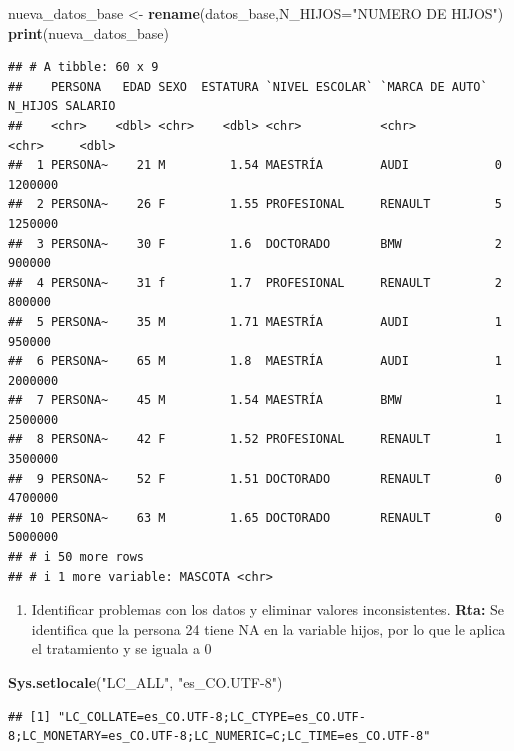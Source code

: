\documentclass[
]{article}
\newenvironment{Shaded}{\begin{snugshade}}{\end{snugshade}}
\newcommand{\AttributeTok}[1]{\textcolor[rgb]{0.13,0.29,0.53}{#1}}
\newcommand{\FunctionTok}[1]{\textcolor[rgb]{0.13,0.29,0.53}{\textbf{#1}}}
\newcommand{\NormalTok}[1]{#1}
\newcommand{\OtherTok}[1]{\textcolor[rgb]{0.56,0.35,0.01}{#1}}
\newcommand{\StringTok}[1]{\textcolor[rgb]{0.31,0.60,0.02}{#1}}
\providecommand{\tightlist}{%
  \setlength{\itemsep}{0pt}\setlength{\parskip}{0pt}}
\begin{document}
\begin{Shaded}
\begin{Highlighting}[]
\NormalTok{nueva\_datos\_base }\OtherTok{\textless{}{-}}
  \FunctionTok{rename}\NormalTok{(datos\_base,}\AttributeTok{N\_HIJOS=}\StringTok{"NUMERO DE HIJOS"}\NormalTok{)}
\FunctionTok{print}\NormalTok{(nueva\_datos\_base)}
\end{Highlighting}
\end{Shaded}

\begin{verbatim}
## # A tibble: 60 x 9
##    PERSONA   EDAD SEXO  ESTATURA `NIVEL ESCOLAR` `MARCA DE AUTO` N_HIJOS SALARIO
##    <chr>    <dbl> <chr>    <dbl> <chr>           <chr>           <chr>     <dbl>
##  1 PERSONA~    21 M         1.54 MAESTRÍA        AUDI            0       1200000
##  2 PERSONA~    26 F         1.55 PROFESIONAL     RENAULT         5       1250000
##  3 PERSONA~    30 F         1.6  DOCTORADO       BMW             2        900000
##  4 PERSONA~    31 f         1.7  PROFESIONAL     RENAULT         2        800000
##  5 PERSONA~    35 M         1.71 MAESTRÍA        AUDI            1        950000
##  6 PERSONA~    65 M         1.8  MAESTRÍA        AUDI            1       2000000
##  7 PERSONA~    45 M         1.54 MAESTRÍA        BMW             1       2500000
##  8 PERSONA~    42 F         1.52 PROFESIONAL     RENAULT         1       3500000
##  9 PERSONA~    52 F         1.51 DOCTORADO       RENAULT         0       4700000
## 10 PERSONA~    63 M         1.65 DOCTORADO       RENAULT         0       5000000
## # i 50 more rows
## # i 1 more variable: MASCOTA <chr>
\end{verbatim}

\begin{enumerate}
\def\labelenumi{\alph{enumi}.}
\setcounter{enumi}{1}
\tightlist
\item
  Identificar problemas con los datos y eliminar valores inconsistentes.
  \textbf{Rta:} Se identifica que la persona 24 tiene NA en la variable
  hijos, por lo que le aplica el tratamiento y se iguala a 0
\end{enumerate}

\begin{Shaded}
\begin{Highlighting}[]
\FunctionTok{Sys.setlocale}\NormalTok{(}\StringTok{"LC\_ALL"}\NormalTok{, }\StringTok{"es\_CO.UTF{-}8"}\NormalTok{) }
\end{Highlighting}
\end{Shaded}

\begin{verbatim}
## [1] "LC_COLLATE=es_CO.UTF-8;LC_CTYPE=es_CO.UTF-8;LC_MONETARY=es_CO.UTF-8;LC_NUMERIC=C;LC_TIME=es_CO.UTF-8"
\end{verbatim}
\end{document}
